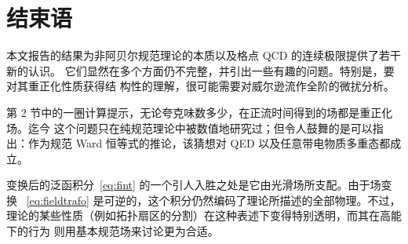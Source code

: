 \section{结束语}

本文报告的结果为非阿贝尔规范理论的本质以及格点 QCD 的连续极限提供了若干新的认识。
它们显然在多个方面仍不完整，并引出一些有趣的问题。特别是，要对其重正化性质获得结
构性的理解，很可能需要对威尔逊流作全阶的微扰分析。

第 2 节中的一圈计算提示，无论夸克味数多少，在正流时间得到的场都是重正化场。迄今
这个问题只在纯规范理论中被数值地研究过；但令人鼓舞的是可以指出：作为规范 Ward
恒等式的推论，该猜想对 QED 以及任意带电物质多重态都成立。

变换后的泛函积分~\eqref{eq:fint} 的一个引人入胜之处是它由光滑场所支配。由于场变换
~\eqref{eq:fieldtrafo} 是可逆的，这个积分仍然编码了理论所描述的全部物理。不过，
理论的某些性质（例如拓扑扇区的分割）在这种表述下变得特别透明，而其在高能下的行为
则用基本规范场来讨论更为合适。

